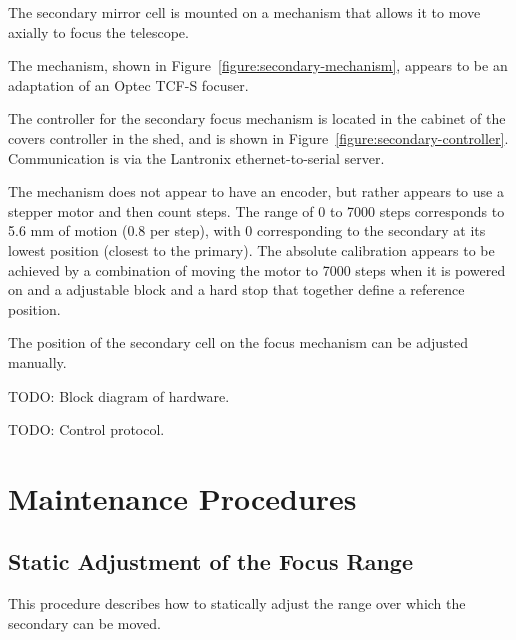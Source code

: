 The secondary mirror cell is mounted on a mechanism that allows it to move axially to focus the telescope.

The mechanism, shown in Figure~\ref{figure:secondary-mechanism}, appears to be an adaptation of an Optec TCF-S focuser. 

The controller for the secondary focus mechanism is located in the cabinet of the covers controller in the shed, and is shown in Figure~\ref{figure:secondary-controller}. Communication is via the Lantronix ethernet-to-serial server.

The mechanism does not appear to have an encoder, but rather appears to use a stepper motor and then count steps. The range of 0 to 7000 steps corresponds to 5.6 mm of motion (0.8 {\micron} per step), with 0 corresponding to the secondary at its lowest position (closest to the primary). The absolute calibration appears to be achieved by a combination of moving the motor to 7000 steps when it is powered on and a adjustable block and a hard stop that together define a reference position.

The position of the secondary cell on the focus mechanism can be adjusted manually.

TODO: Block diagram of hardware.

TODO: Control protocol.

\section{Maintenance Procedures}

\subsection{Static Adjustment of the Focus Range}
\label{section:secondary:static-adjustmentl}

This procedure describes how to statically adjust the range over which the secondary can be moved.

